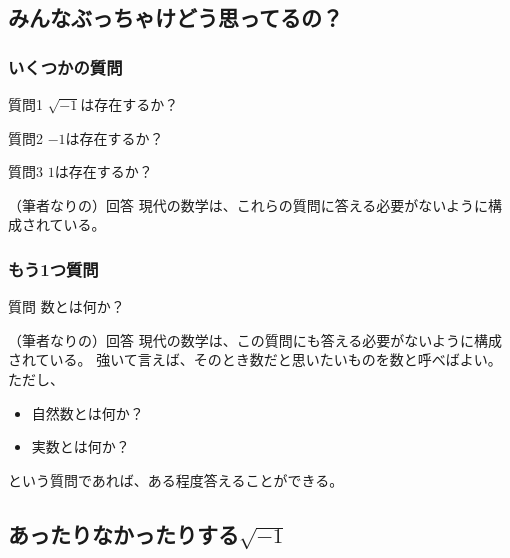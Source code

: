 \documentclass[dvipdfmx]{beamer}
\begin{document}
  \subsection{みんなぶっちゃけどう思ってるの？}

  \begin{frame}
    \frametitle{いくつかの質問}
  
    \begin{block}{質問1}
      $\sqrt{-1}$は存在するか？
    \end{block}

    \pause

    \begin{block}{質問2}
      $-1$は存在するか？
    \end{block}

    \pause

    \begin{block}{質問3}
      $1$は存在するか？
    \end{block}

    \pause

    \begin{block}{（筆者なりの）回答}
      現代の数学は、これらの質問に答える必要がないように構成されている。
    \end{block}

  \end{frame}

  \begin{frame}
    \frametitle{もう1つ質問}
  
    \begin{block}{質問}
      数とは何か？
    \end{block}

    \pause

    \begin{block}{（筆者なりの）回答}
      現代の数学は、この質問にも答える必要がないように構成されている。
      強いて言えば、そのとき数だと思いたいものを数と呼べばよい。
      ただし、
      \begin{itemize}
        \item 自然数とは何か？
        \item 実数とは何か？
      \end{itemize}
      という質問であれば、ある程度答えることができる。
    \end{block}
  
  \end{frame}

  \subsection{あったりなかったりする$\sqrt{-1}$}
\end{document}

